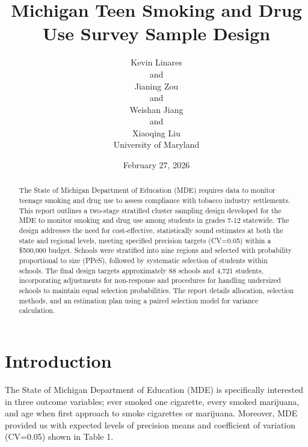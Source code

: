 \documentclass[
  12pt]{article}
\begin{document}
\def\spacingset#1{\renewcommand{\baselinestretch}%
{#1}\small\normalsize} \spacingset{1}



\date{February 27, 2026}
\title{\bf Michigan Teen Smoking and Drug Use Survey Sample Design}
\author{
Kevin Linares\\
and\\Jianing Zou\\
and\\Weishan Jiang\\
and\\Xiaoqing Liu\\
University of Maryland\\
}
\maketitle

\bigskip
\bigskip
\begin{abstract}
The State of Michigan Department of Education (MDE) requires data to
monitor teenage smoking and drug use to assess compliance with tobacco
industry settlements. This report outlines a two-stage stratified
cluster sampling design developed for the MDE to monitor smoking and
drug use among students in grades 7-12 statewide. The design addresses
the need for cost-effective, statistically sound estimates at both the
state and regional levels, meeting specified precision targets (CV=0.05)
within a \$500,000 budget. Schools were stratified into nine regions and
selected with probability proportional to size (PPeS), followed by
systematic selection of students within schools. The final design
targets approximately 88 schools and 4,721 students, incorporating
adjustments for non-response and procedures for handling undersized
schools to maintain equal selection probabilities. The report details
allocation, selection methods, and an estimation plan using a paired
selection model for variance calculation.
\end{abstract}


\newpage
\spacingset{1.9} %


\section{Introduction}\label{sec-intro}

The State of Michigan Department of Education (MDE) is specifically
interested in three outcome variables; ever smoked one cigarette, every
smoked marijuana, and age when first approach to smoke cigarettes or
marijuana. Moreover, MDE provided us with expected levels of precision
means and coefficient of variation (CV=0.05) shown in Table 1.
\end{document}
